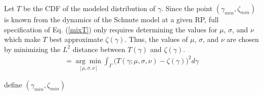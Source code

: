Let $T$ be the CDF of the modeled distribution of $\gamma$. Since the point
$(\gamma_{min}, \zeta_{min})$ is known from the dynamics of the Schnute model
at a given RP, full specification of Eq. (\ref{mixT}) only requires determining
the values for $\mu$, $\sigma$, and $\nu$ which make $T$ best approximate
$\zeta(\gamma)$. Thus, the values of $\mu$, $\sigma$, and $\nu$ are chosen by
minimizing the $L^2$ distance between $T(\gamma)$ and $\zeta(\gamma)$.
\begin{align}
[\hat\mu, \hat\sigma, \hat\nu]=\underset{{[\mu, \sigma, \nu]}}{\arg\min}\int_\Gamma \big(T(\gamma; \mu, \sigma, \nu) - \zeta(\gamma)\big)^2 d\gamma
\end{align}

{\color{red}
\cite{punt_extending_2019} \cite{myers_maximum_1999} define $(\gamma_{min}, \zeta_{min})$
}

